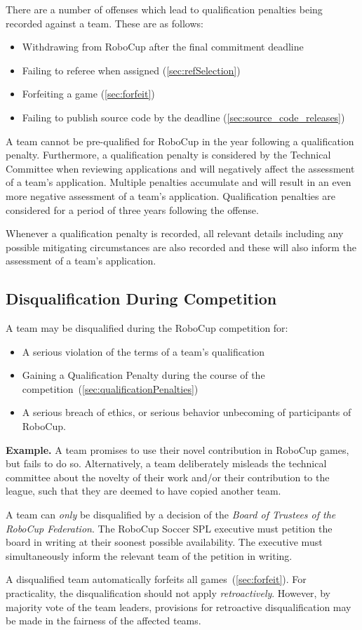 There are a number of offenses which lead to qualification penalties being recorded against a team.
These are as follows:
\begin{itemize}
  \item Withdrawing from RoboCup after the final commitment deadline
  \item Failing to referee when assigned (\cref{sec:refSelection})
  \item Forfeiting a game (\cref{sec:forfeit})
  \item Failing to publish source code by the deadline (\cref{sec:source_code_releases})
\end{itemize}

A team cannot be pre-qualified for RoboCup in the year following a qualification penalty.
Furthermore, a qualification penalty is considered by the Technical Committee when reviewing applications and will negatively affect the assessment of a team's application.
Multiple penalties accumulate and will result in an even more negative assessment of a team's application.
Qualification penalties are considered for a period of three years following the offense.

Whenever a qualification penalty is recorded, all relevant details including any possible mitigating circumstances are also recorded and these will also inform the assessment of a team's application.

\subsection{Disqualification During Competition}
\label{sec:disqualification_during_comp}

A team may be disqualified during the RoboCup competition for:
\begin{itemize}
  \item A serious violation of the terms of a team's qualification
  \item Gaining a Qualification Penalty during the course of the competition~(\cf \cref{sec:qualificationPenalties})
  \item A serious breach of ethics, or serious behavior unbecoming of participants of RoboCup.
\end{itemize}

\textbf{Example.} A team promises to use their novel contribution in RoboCup games, but fails to do so.
Alternatively, a team deliberately misleads the technical committee about the novelty of their work and/or their contribution to the league, such that they are deemed to have copied another team.

A team can \textit{only} be disqualified by a decision of the \textit{Board of Trustees of the RoboCup Federation}.
The RoboCup Soccer SPL executive must petition the board in writing at their soonest possible availability.
The executive must simultaneously inform the relevant team of the petition in writing.

A disqualified team automatically forfeits all games~(\cf \cref{sec:forfeit}).
For practicality, the disqualification should not apply \textit{retroactively}.
However, by majority vote of the team leaders, provisions for retroactive disqualification may be made in the fairness of the affected teams.
